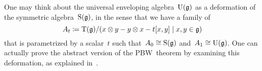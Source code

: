 \begin{remark}
	One may think about the universal enveloping algebra~$\operatorname{U}(\mathfrak{g})$ as a deformation of the symmetric algebra~$\operatorname{S}(\mathfrak{g})$, in the sense that we have a family of~\algebras{$\kf$}
	\[
		A_t
		\defined
		\Tensor(\glie)
		/
		\ideal{ x \tensor y - y \tensor x - t[x,y] \suchthat x, y \in \glie }
	\]
	that is parametrized by a scalar~$t$ such that~$A_0 \cong \operatorname{S}(\mathfrak{g})$ and~$A_1 \cong \operatorname{U}(\mathfrak{g})$.
	One can actually prove the abstract version of the PBW~theorem by examining this deformation, as explained in~\cite{pbw_deformation}.
\end{remark}





